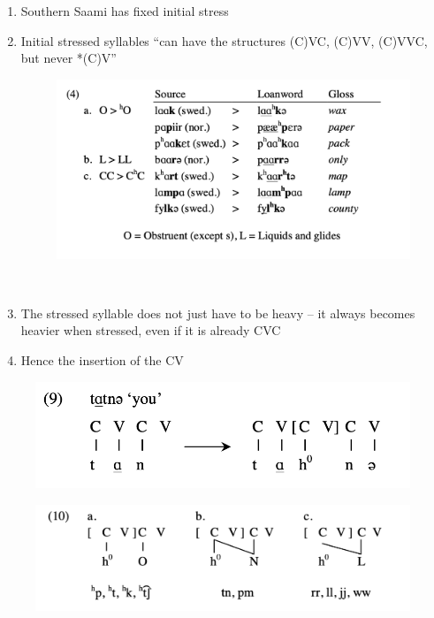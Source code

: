 \documentclass[a4paper, 12pt]{article}
\begin{document}
	\begin{enumerate}[$\gg$]
		\item Southern Saami has fixed initial stress
		\item Initial stressed syllables ``can have the structures (C)VC, (C)VV, (C)VVC, but never *(C)V'' \parencite[p. 49]{enguehard2014}
		
	\begin{figure}[H]
		\centering
		\includegraphics[width=.9\textwidth]{enguehard2014-49}
	\end{figure} \vspace*{-2em}\hfill \parencite[p. 49]{enguehard2014}\\
		\item The stressed syllable does not just have to be heavy -- it always becomes heavier when stressed, even if it is already CVC
		\item Hence the insertion of the CV
	\end{enumerate}

	\begin{figure}[H]
		\includegraphics[width=.6\textwidth]{enguehard2014-54a}
	\end{figure}
	
	\begin{figure}[H]
		\includegraphics[width=.8\textwidth]{enguehard2014-54b}
		\\ \hfill \parencite[p. 54]{enguehard2014}
	\end{figure}
			
\end{document}
